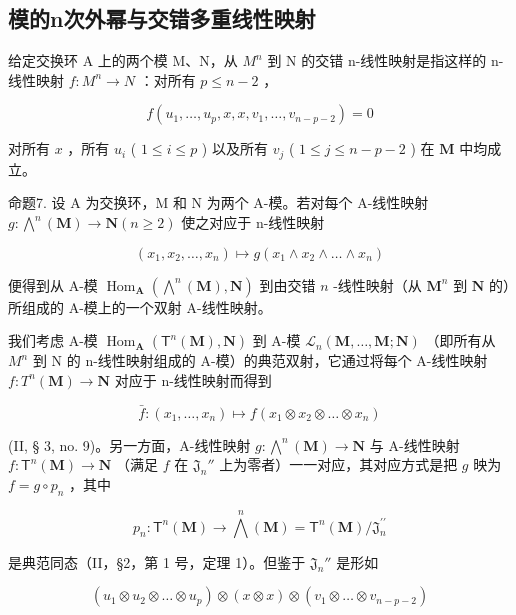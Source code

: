 \subsection{模的n次外幂与交错多重线性映射}

给定交换环 A 上的两个模 M、N，从 \(M^{n}\) 到 N 的交错 n-线性映射是指这样的 n-线性映射 \(f: M^{n} \to N\) ：对所有 \(p \leqslant n - 2\) ，

\[
f (u _ {1}, \dots , u _ {p}, x, x, v _ {1}, \dots , v _ {n - p - 2}) = 0\tag{8}
\]

对所有 \(x\) ，所有 \(u_{i}\) ( \(1 \leqslant i \leqslant p\) ) 以及所有 \(v_{j}\) ( \(1 \leqslant j \leqslant n - p - 2\) ) 在 \(\mathbf{M}\) 中均成立。

命题7. 设 A 为交换环，M 和 N 为两个 A-模。若对每个 A-线性映射 \(g: \bigwedge^n (\mathbf{M}) \to \mathbf{N} (n \geqslant 2)\) 使之对应于 n-线性映射

\[
\left(x _ {1}, x _ {2}, \dots , x _ {n}\right) \mapsto g \left(x _ {1} \wedge x _ {2} \wedge \dots \wedge x _ {n}\right)\tag{9}
\]

便得到从 A-模 \(\operatorname{Hom}_{\mathbf{A}}(\bigwedge^{n}(\mathbf{M}), \mathbf{N})\) 到由交错 \(n\) -线性映射（从 \(\mathbf{M}^n\) 到 \(\mathbf{N}\) 的）所组成的 A-模上的一个双射 A-线性映射。

我们考虑 A-模 \(\operatorname{Hom}_{\mathbf{A}}(\mathsf{T}^{n}(\mathbf{M}),\mathbf{N})\) 到 A-模 \(\mathcal{L}_{n}(\mathbf{M},\ldots,\mathbf{M};\mathbf{N})\) （即所有从 \(M^{n}\) 到 N 的 n-线性映射组成的 A-模）的典范双射，它通过将每个 A-线性映射 \(f: T^{n}(\mathbf{M}) \to \mathbf{N}\) 对应于 n-线性映射而得到

\[
\bar {f} \colon (x _ {1}, \dots , x _ {n}) \mapsto f (x _ {1} \otimes x _ {2} \otimes \dots \otimes x _ {n})
\]

(II, § 3, no. 9)。另一方面，A-线性映射 \(g \colon \bigwedge^{n}(\mathbf{M}) \to \mathbf{N}\) 与 A-线性映射 \(f \colon \mathsf{T}^n (\mathbf{M}) \to \mathbf{N}\) （满足 \(f\) 在 \(\mathfrak{J}_n''\) 上为零者）一一对应，其对应方式是把 \(g\) 映为 \(f = g \circ p_n\) ，其中

\[
p _ {n} \colon \mathsf {T} ^ {n} (\mathbf {M}) \rightarrow \bigwedge^ {n} (\mathbf {M}) = \mathsf {T} ^ {n} (\mathbf {M}) / \mathfrak {J} _ {n} ^ {\prime \prime}
\]

是典范同态（II，§2，第 1 号，定理 1）。但鉴于 \(\mathfrak{J}_n''\) 是形如

\[
\left(u _ {1} \otimes u _ {2} \otimes \dots \otimes u _ {p}\right) \otimes (x \otimes x) \otimes \left(v _ {1} \otimes \dots \otimes v _ {n - p - 2}\right)
\]

